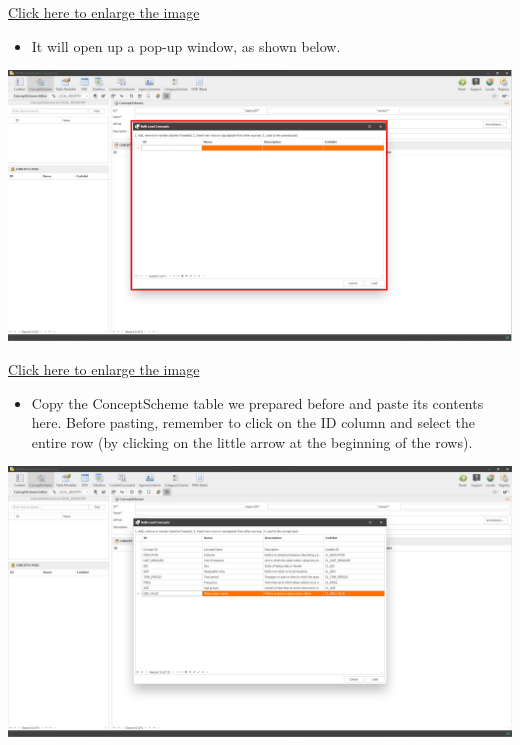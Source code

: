 \documentclass[
]{book}
\providecommand{\tightlist}{%
  \setlength{\itemsep}{0pt}\setlength{\parskip}{0pt}}
\theoremstyle{definition}
\theoremstyle{definition}
\theoremstyle{definition}
\theoremstyle{definition}
\theoremstyle{remark}
\begin{document}
\href{images/image102.png}{Click here to enlarge the image}

\begin{itemize}
\tightlist
\item
  It will open up a pop-up window, as shown below.
\end{itemize}

\begin{center}\includegraphics[width=1\linewidth]{./images/image104} \end{center}

\href{images/image104.png}{Click here to enlarge the image}

\begin{itemize}
\tightlist
\item
  Copy the ConceptScheme table we prepared before and paste its contents here. Before pasting, remember to click on the ID column and select the entire row (by clicking on the little arrow at the beginning of the rows).
\end{itemize}

\begin{center}\includegraphics[width=1\linewidth]{./images/image106} \end{center}
\end{document}
